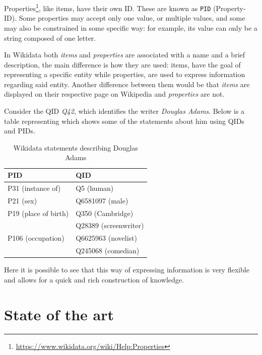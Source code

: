 \documentclass[epsfig,a4paper,11pt,titlepage,twoside,openany]{book}
\newcommand{\footurl}[1]{\footnote{\url{#1}}}
\begin{document}
Properties\footurl{https://www.wikidata.org/wiki/Help:Properties}, like items,
have their own ID. These are known as \texttt{PID} (Property-ID). Some properties may accept only one value, or multiple values, and
some may also be constrained in some specific way: for example, its value can
only be a string composed of one letter.

In Wikidata both \textit{items} and \textit{properties} are associated with a name and a
brief description, the main difference is how they are used: items, have the
goal of representing a specific entity while properties, are used to express 
information regarding said entity. Another difference between them would be that \textit{items} are displayed on their respective page on Wikipedia and \textit{properties} are not.

Consider the QID \textit{Q42}, which identifies the writer
\textit{Douglas Adams}. Below is a table representing which shows some of the statements about him
using QIDs and PIDs.

\begin{table}[H]
  \centering
  \begin{tabular}{l|l}
    PID                                & QID                   \\ \hline
    P31 (instance of)                  & Q5 (human)            \\ \hline
    P21 (sex)                          & Q6581097 (male)       \\ \hline
    P19 (place of birth)               & Q350 (Cambridge)      \\ \hline
    \multirow{3}{*}{P106 (occupation)} & Q28389 (screenwriter) \\ \cline{2-2} 
                                       & Q6625963 (novelist)   \\ \cline{2-2} 
                                       & Q245068 (comedian)   
  \end{tabular}
  \caption{Wikidata statements describing Douglas Adams}
  \label{tab:intro-wikidata-douglas42}
\end{table}

Here it is possible to see that this way of expressing information is very
flexible and allows for a quick and rich construction of knowledge. 






\chapter{State of the art}
\label{chap:state-of-the-art}
\end{document}
